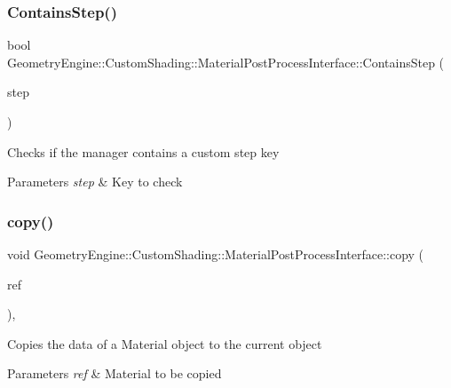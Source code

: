 \subsubsection{\texorpdfstring{ContainsStep()}{ContainsStep()}}
{\footnotesize\ttfamily bool Geometry\+Engine\+::\+Custom\+Shading\+::\+Material\+Post\+Process\+Interface\+::\+Contains\+Step (\begin{DoxyParamCaption}\item[{\mbox{\hyperlink{namespace_geometry_engine_1_1_custom_shading_af8b09b91ca7086f4f67a5d4181f35e58}{Material\+Post\+Process\+Steps}}}]{step }\end{DoxyParamCaption})\hspace{0.3cm}{\ttfamily [inline]}}

Checks if the manager contains a custom step key 
\begin{DoxyParams}{Parameters}
{\em step} & Key to check \\
\hline
\end{DoxyParams}
\mbox{\label{class_geometry_engine_1_1_custom_shading_1_1_material_post_process_interface_a64c1c173ff46d30bd3beddc4081b3c57}} 
\subsubsection{\texorpdfstring{copy()}{copy()}}
{\footnotesize\ttfamily void Geometry\+Engine\+::\+Custom\+Shading\+::\+Material\+Post\+Process\+Interface\+::copy (\begin{DoxyParamCaption}\item[{const \mbox{\hyperlink{class_geometry_engine_1_1_custom_shading_1_1_material_post_process_interface}{Material\+Post\+Process\+Interface}} \&}]{ref }\end{DoxyParamCaption})\hspace{0.3cm}{\ttfamily [protected]}, {\ttfamily [virtual]}}

Copies the data of a Material object to the current object 
\begin{DoxyParams}{Parameters}
{\em ref} & Material to be copied \\
\hline
\end{DoxyParams}
\mbox{\label{class_geometry_engine_1_1_custom_shading_1_1_material_post_process_interface_aea6152ec8a2a50e20d9045840cc6bce2}} 
